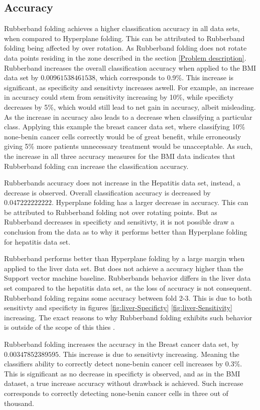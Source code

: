 \documentclass[a4paper,twoside]{bth}
\begin{document}
\subsection{Accuracy}
Rubberband folding achieves a higher classification accuracy in all data sets, when compared to Hyperplane folding. This can be attributed to Rubberband folding being affected by over rotation. As Rubberband folding does not rotate data points residing in the zone described in the section \ref{Problem description}. Rubberband increases the overall classification accuracy when applied to the BMI data set by $0.00961538461538$, which corresponds to 0.9\%. This increase is significant, as specificity and sensitivty increases aswell. For example,  an increase in accuracy could stem from sensitivity increasing by 10\%, while specificty decreases by 5\%, which would still lead to net gain in accuracy, albeit misleading. As the increase in accuracy also leads to a decrease when classifying a particular class. Applying this example the breast cancer data set, where classifying 10\% none-benin cancer cells correctly would be of great benefit, while erroneously giving 5\% more patients unnecessary treatment would be unacceptable. As such, the increase in all three accuracy measures for the BMI data indicates that Rubberband folding can increase the classification accuracy. 
\par Rubberbands accuracy does not increase in the Hepatitis data set, instead, a decrease is observed. Overall classification accuracy is decreased by $0.047222222222$. Hyperplane folding has a larger decrease in accuracy. This can be attributed to Rubberband folding not over rotating points. But as Rubberband decreases in specificty and sensitivty, it is not possible draw a conclusion from the data as to why it performs better than Hyperplane folding for hepatitis data set. 
\par Rubberband performs better than Hyperplane folding by a large margin when applied to the liver data set. But does not achieve a accuracy higher than the Support vector machine baseline. Rubberbands behavior differs in the liver data set compared to the hepatitis data set, as the loss of accuracy is not consequent. Rubberband folding regains some accuracy between fold 2-3. This is due to both sensitivty and specificty in figures \ref{fig:liver-Specificty} \ref{fig:liver-Sensitivity} increasing. The exact reasons to why Rubberband folding exhibits such behavior is outside of the scope of this thies . \par
Rubberband folding increases the accuracy in the Breast cancer data set, by $0.00347852389595$. This increase is due to sensitivty increasing. Meaning the classifiers ability to correctly detect none-benin cancer cell increases by 0.3\%. This is significant as no decrease in specificty is observed, and as in the BMI dataset, a true increase accuracy without drawback is achieved. Such increase corresponds to correctly detecting none-benin cancer cells in three out of thousand.
\end{document}

